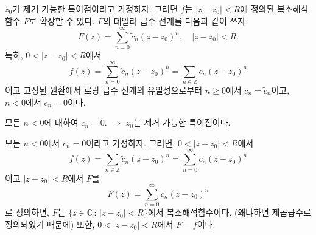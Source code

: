 $z_0$가 제거 가능한 특이점이라고 가정하자.
그러면 $f$는 $|z-z_0|<R$에 정의된 복소해석함수 $F$로 확장할 수 있다.
$F$의 테일러 급수 전개를 다음과 같이 쓰자.
\[
F(z) = \sum_{n=0}^\infty  \tilde c_n (z-z_0)^n,\quad
|z-z_0| <R.
\]
특히, $0<|z-z_0| <R$에서
\[
f(z) = \sum_{n=0}^\infty  \tilde c_n (z-z_0)^n 
= \sum_{n\in\mathbb Z} c_n(z-z_0)^n
\]
이고 고정된 원환에서 로랑 급수 전개의 유일성으로부터
$n\ge0$에서 $c_n = \tilde c_n$이고,
$n<0$에서 $c_n=0$이다.

\begin{tcolorbox}[tcbox raise base, nobeforeafter, hbox, colback=white, colframe = mydarkframe, boxrule=1pt]
모든 $n<0$에 대하여 $c_n=0$.
$\Rightarrow$ $z_0$는 제거 가능한 특이점이다.
\end{tcolorbox}

모든 $n<0$에서 $c_n=0$이라고 가정하자. 그러면,
$0<|z-z_0|<R$에서
\[
f(z) = \sum_{n\in\mathbb Z} \tilde c_n (z-z_0)^n
= \sum_{n=0}^\infty  c_n (z-z_0)^n
\]
이고 $|z-z_0|<R$에서 $F$를
\[
F(z) = \sum_{n=0}^\infty  c_n (z-z_0)^n
\]
로 정의하면, $F$는 
$\{ z\in\mathbb C\,:\, |z-z_0|<R\}$에서 복소해석함수이다.
(왜냐하면 제곱급수로 정의되었기 때문에)
또한, $0<|z-z_0|<R$에서 $F=f$이다.

